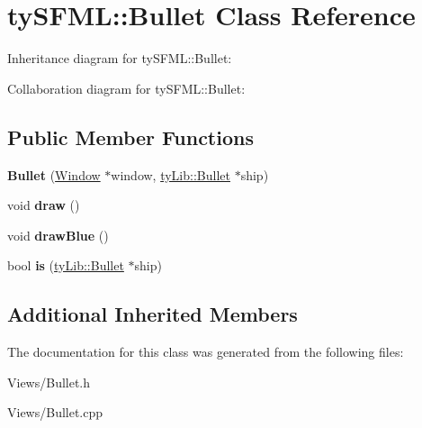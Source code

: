 \hypertarget{classty_s_f_m_l_1_1_bullet}{}\section{ty\+S\+F\+M\+L\+:\+:Bullet Class Reference}
\label{classty_s_f_m_l_1_1_bullet}


Inheritance diagram for ty\+S\+F\+M\+L\+:\+:Bullet\+:


Collaboration diagram for ty\+S\+F\+M\+L\+:\+:Bullet\+:
\subsection*{Public Member Functions}
\begin{DoxyCompactItemize}
\item 
\hypertarget{classty_s_f_m_l_1_1_bullet_a096edeb30edb67644174d3a2aed63e74}{}{\bfseries Bullet} (\hyperlink{classty_s_f_m_l_1_1_window}{Window} $\ast$window, \hyperlink{classty_lib_1_1_bullet}{ty\+Lib\+::\+Bullet} $\ast$ship)\label{classty_s_f_m_l_1_1_bullet_a096edeb30edb67644174d3a2aed63e74}

\item 
\hypertarget{classty_s_f_m_l_1_1_bullet_af62b59864921fe323cf52216837850d3}{}void {\bfseries draw} ()\label{classty_s_f_m_l_1_1_bullet_af62b59864921fe323cf52216837850d3}

\item 
\hypertarget{classty_s_f_m_l_1_1_bullet_a7000914735344a25c5c9dc5492285278}{}void {\bfseries draw\+Blue} ()\label{classty_s_f_m_l_1_1_bullet_a7000914735344a25c5c9dc5492285278}

\item 
\hypertarget{classty_s_f_m_l_1_1_bullet_adf096c95df6e07730c57bc03f1d26e23}{}bool {\bfseries is} (\hyperlink{classty_lib_1_1_bullet}{ty\+Lib\+::\+Bullet} $\ast$ship)\label{classty_s_f_m_l_1_1_bullet_adf096c95df6e07730c57bc03f1d26e23}

\end{DoxyCompactItemize}
\subsection*{Additional Inherited Members}


The documentation for this class was generated from the following files\+:\begin{DoxyCompactItemize}
\item 
Views/Bullet.\+h\item 
Views/Bullet.\+cpp\end{DoxyCompactItemize}

